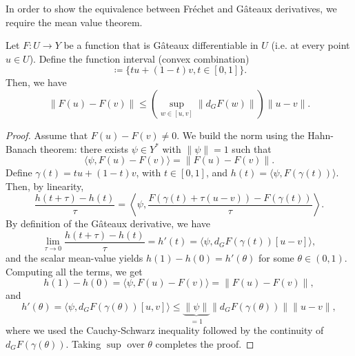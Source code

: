In order to show the equivalence between Fréchet and Gâteaux derivatives, we require the mean value theorem. 
\begin{theorem}\label{thm:mean-value-banach}
    Let $F:U\to Y$ be a function that is Gâteaux differentiable in $U$ (i.e. at every point $u\in U$). Define the function interval (convex combination)
    \begin{equation*}
        [u,v] \coloneqq \{tu+(1-t)v, t\in[0,1]\}.
    \end{equation*}
    Then, we have
    \begin{equation*}
        \|F(u)-F(v)\| \leq \left(\sup_{w\in[u,v]} \|d_G F(w)\|\right) \|u-v\|. 
    \end{equation*}
    \begin{proof}
        Assume that $F(u)-F(v)\neq 0$. We build the norm using the Hahn-Banach theorem: there exists $\psi \in Y^*$ with $\|\psi\|=1$ such that 
        \begin{equation*}
            \langle \psi, F(u)-F(v)\rangle = \|F(u)-F(v)\|. 
        \end{equation*}    
        Define $\gamma(t) = tu + (1-t)v$, with $t\in [0,1]$, and $h(t)=\langle \psi, F(\gamma(t))\rangle$. Then, by linearity, 
        \begin{equation*}
            \frac{h(t+\tau) - h(t)}{\tau} = \left\langle \psi, \frac{F(\gamma(t) + \tau(u-v)) - F(\gamma(t))}{\tau} \right\rangle.
        \end{equation*}
        By definition of the Gâteaux derivative, we have
        \begin{equation*}
            \lim_{\tau\to 0} \frac{h(t+\tau) - h(t)}{\tau} = h'(t) = \langle \psi, d_G F(\gamma(t)) [u-v]\rangle, 
        \end{equation*}
        and the scalar mean-value yields $h(1)-h(0) = h'(\theta)$ for some $\theta\in(0,1)$. Computing all the terms, we get
        \begin{equation*}
            h(1)-h(0) = \langle \psi, F(u)-F(v)\rangle = \|F(u)-F(v)\|,
        \end{equation*}
        and 
        \begin{equation*}
            h'(\theta) = \langle \psi, d_G F(\gamma(\theta))[u,v]\rangle \leq \underbrace{\|\psi\|}_{=1} \|d_G F(\gamma(\theta))\| \|u-v\|,
        \end{equation*}
        where we used the Cauchy-Schwarz inequality followed by the continuity of $d_G F(\gamma(\theta))$. Taking $\sup$ over $\theta$ completes the proof. 
    \end{proof}
\end{theorem}

